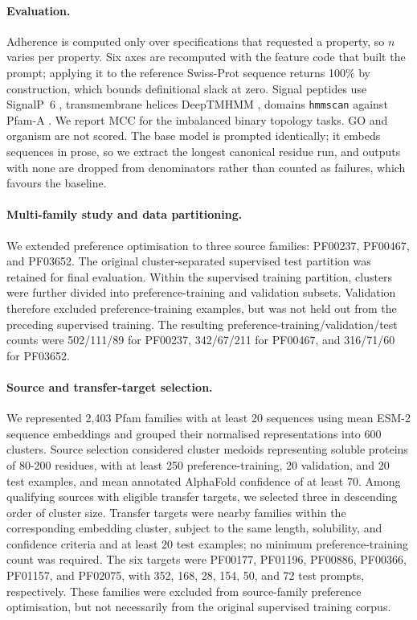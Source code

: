 \documentclass{article} %
\newcommand{\pct}{\%}
\begin{document}
\paragraph{Evaluation.} Adherence is computed only over specifications that
requested a property, so $n$ varies per property. Six axes are recomputed with
the feature code that built the prompt; applying it to the reference Swiss-Prot
sequence returns 100\pct{} by construction, which bounds definitional slack at
zero. Signal peptides use SignalP~6 \citep{teufel2022signalp6}, transmembrane
helices DeepTMHMM \citep{hallgren2022deeptmhmm}, domains \texttt{hmmscan}
\citep{eddy2011hmmer} against Pfam-A \citep{mistry2021pfam}. We report MCC for
the imbalanced binary topology tasks. GO and organism are not scored. The base
model is prompted identically; it embeds sequences in prose, so we extract the
longest canonical residue run, and outputs with none are dropped from
denominators rather than counted as failures, which favours the baseline.

\paragraph{Multi-family study and data partitioning.}
We extended preference optimisation to three source families:
PF00237, PF00467, and PF03652. The original cluster-separated
supervised test partition was retained for final evaluation.
Within the supervised training partition, clusters were further
divided into preference-training and validation subsets.
Validation therefore excluded preference-training examples,
but was not held out from the preceding supervised training.
The resulting preference-training/validation/test counts were
502/111/89 for PF00237, 342/67/211 for PF00467, and
316/71/60 for PF03652.

\paragraph{Source and transfer-target selection.}
We represented 2,403 Pfam families with at least 20 sequences
using mean ESM-2 sequence embeddings and grouped their normalised
representations into 600 clusters. Source selection considered
cluster medoids representing soluble proteins of 80-200 residues,
with at least 250 preference-training, 20 validation, and 20 test
examples, and mean annotated AlphaFold confidence of at least 70.
Among qualifying sources with eligible transfer targets, we
selected three in descending order of cluster size.
Transfer targets were nearby families within the corresponding
embedding cluster, subject to the same length, solubility, and
confidence criteria and at least 20 test examples; no minimum
preference-training count was required.
The six targets were PF00177, PF01196, PF00886, PF00366,
PF01157, and PF02075, with 352, 168, 28, 154, 50, and 72
test prompts, respectively. These families were excluded from
source-family preference optimisation, but not necessarily
from the original supervised training corpus.
\end{document}
